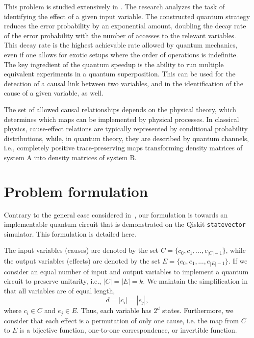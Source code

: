 \documentclass[%
 aps,
 jmp,%
 amsmath,amssymb,
 reprint,%
]{revtex4-2}
\begin{document}
This problem is studied extensively in \cite{chiribella2019quantum}.
The research analyzes the task of identifying the effect of a given input variable.
The constructed quantum strategy reduces the error probability by an exponential amount, doubling the decay rate of the error probability with the number of accesses to the relevant variables. 
This decay rate is the highest achievable rate allowed by quantum mechanics, even if one allows for exotic setups where the order of operations is indefinite.
The key ingredient of the quantum speedup is the ability to run multiple equivalent experiments in a quantum superposition.
This can be used for the detection of a causal link between two variables, and in the identification of the cause of a given variable, as well.

The set of allowed causal relationships depends on the physical theory, which determines which maps can be implemented by physical processes.
In classical physics, cause-effect relations are typically represented by conditional probability distributions, while, in quantum theory, they are described by quantum channels, i.e., completely positive trace-preserving maps transforming density matrices of system A into density matrices of system B.
\section{Problem formulation} \label{sec:prob-formulation}
Contrary to the general case considered in~\cite{chiribella2019quantum}, our formulation is towards an implementable quantum circuit that is demonstrated on the Qiskit \texttt{statevector} simulator. 
This formulation is detailed here. 

The input variables (causes) are denoted by the set $C = \{c_0, c_1,\dots, c_{|C|-1}\}$, while the output variables (effects) are denoted by the set $E = \{e_0, e_1,\dots, e_{|E|-1}\}$.
If we consider an equal number of input and output variables to implement a quantum circuit to preserve unitarity, i.e., $|C| = |E| = k$. 
We maintain the simplification in \cite{chiribella2019quantum} that all variables are of equal length, 
\begin{equation}
d = |c_i| = |e_j|,
\end{equation}
where $c_i \in C$ and $e_j \in E$.
Thus, each variable has $2^d$ states. 
Furthermore, we consider that each effect is a permutation of only one cause, i.e. the map from $C$ to $E$ is a bijective function, one-to-one correspondence, or invertible function.
\end{document}
